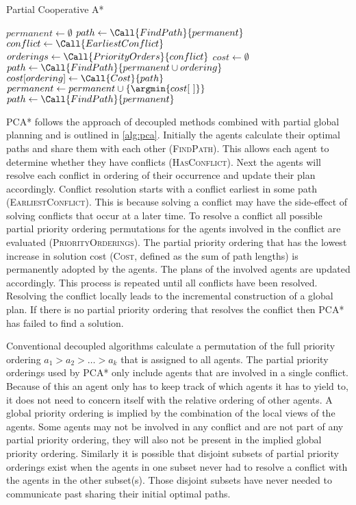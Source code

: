 \begin{algorithm}[t]
	\caption{Partial Cooperative A*}
	\label{alg:pca}
	\begin{algorithmic}[1]
		\State $permanent \gets \emptyset$
		\State $path \gets \Call{FindPath}{permanent}$
			\State $conflict \gets \Call{EarliestConflict}$
			\State $orderings \gets \Call{PriorityOrders}{conflict}$ 
			\State $cost \gets \emptyset$
				\State $path \gets \Call{FindPath}{permanent \cup ordering}$
				\State $cost[ordering] \gets \Call{Cost}{path}$
			\EndFor
			\State $permanent \gets permanent \cup \{ \argmin{cost[~]} \}$
			\State $path \gets \Call{FindPath}{permanent}$
		\EndWhile
	\end{algorithmic}
\end{algorithm}

PCA* follows the approach of decoupled methods combined with partial 
global planning and is outlined in \autoref{alg:pca}. Initially the agents 
calculate their optimal paths and share them with each other (\textsc{FindPath}). This allows
each agent to determine whether they have conflicts (\textsc{HasConflict}). Next the
agents will resolve each conflict in ordering of their occurrence and update 
their 
plan accordingly. Conflict resolution starts with a conflict earliest in some path (\textsc{EarliestConflict}). This is because solving a conflict may have the 
side-effect of solving conflicts that occur at a later time. To resolve a 
conflict all possible partial priority ordering permutations for the agents 
involved in the conflict are evaluated (\textsc{PriorityOrderings}). The partial priority ordering that has 
the 
lowest increase in solution cost (\textsc{Cost}, defined as the sum of path lengths) is permanently adopted 
by the agents. The plans of the involved agents are updated accordingly. This 
process is repeated until all conflicts have been resolved. Resolving the 
conflict locally leads to the incremental construction of a global plan. If 
there is no partial priority ordering that resolves the conflict then PCA* has 
failed to find a solution.

Conventional decoupled algorithms calculate a permutation of the full priority 
ordering $a_1 > a_2 > \ldots > a_k$ that is assigned to all agents. The partial 
priority orderings used by PCA* only include agents that are involved in a 
single conflict. Because of this an agent only has to keep track of which 
agents it has to yield to, it does not need to concern itself with the 
relative ordering of other agents. A global priority ordering is implied by the 
combination of the local views of the agents. Some agents may not be involved 
in any conflict and are not part of any partial priority ordering, 
they will also not be present in the implied global priority ordering. 
Similarly 
it is possible that disjoint subsets of partial priority orderings exist when 
the 
agents in one subset never had to resolve a conflict with the agents in the 
other subset(s). Those disjoint subsets have never needed to communicate past 
sharing their initial optimal paths.

